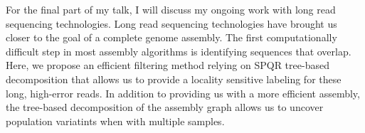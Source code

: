 For the final part of my talk, I will discuss my ongoing work with long read sequencing technologies. Long read sequencing technologies have brought us closer to the goal of a complete genome assembly.  The first computationally difficult step in most assembly algorithms is identifying sequences that overlap.  Here, we propose an efficient filtering method relying on SPQR tree-based decomposition that allows us to provide a locality sensitive labeling for these long, high-error reads.  In addition to providing us with a more efficient assembly, the tree-based decomposition of the assembly graph allows us to uncover population variatints when with multiple samples.
